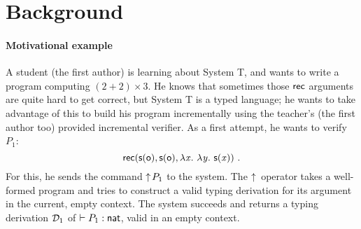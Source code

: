 \documentclass[9pt]{sigplanconf}
\begin{document}

\section{Background}

\paragraph{Motivational example}

A student (the first author) is learning about System \sysname T, and
wants to write a program computing $(2+2)\times 3$. He knows that
sometimes those $\text{\textsf{rec}}$ arguments are quite hard to get correct,
but System \sysname T is a typed language; he wants to take advantage
of this to build his program incrementally using the teacher's (the
first author too) provided incremental verifier. As a first attempt,
he wants to verify $P_1$:
$$
\text{\textsf{rec}}({\text{\textsf{s}} ({\text{\textsf{o}}})},{\text{\textsf{s}} ({\text{\textsf{o}}})},{\lambda{\ensuremath{\text{\textit{x}}}}.\ \lambda{\ensuremath{\text{\textit{y}}}}.\  \text{\textsf{s}} ({\text{\textit{x}}})})\ \text{.}
$$
For this, he sends the command $\uparrow\!{P_1}$ to the system. The
$\uparrow\!{}$ operator takes a well-formed program and tries to construct
a valid typing derivation for its argument in the current, empty
context. The system succeeds and returns a typing derivation $\mathcal D_1$
of \/ $\vdash P_1 : \text{\textsf{nat}}$, valid in an empty context.
\end{document}
